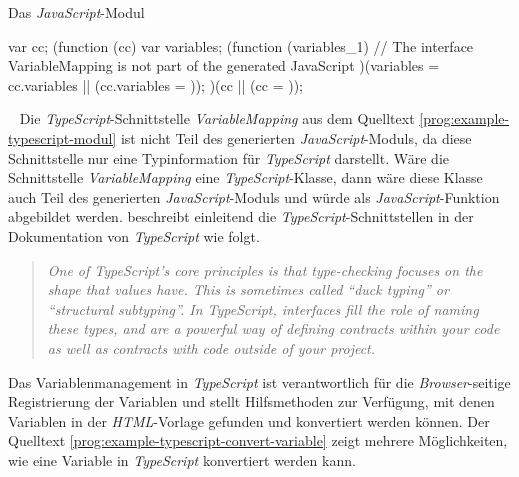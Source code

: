 \begin{program}[h]
\caption{Das \emph{JavaScript}-Modul}
\label{prog:example-javascript-modul}
\begin{JsCode}[numbers=none]
var cc;
(function (cc) {
    var variables;
    (function (variables_1) {
    // The interface VariableMapping is not part of the generated JavaScript
    })(variables = cc.variables || (cc.variables = {}));
})(cc || (cc = {}));                 
\end{JsCode}
\end{program}
\ \newline
Die \emph{TypeScript}-Schnittstelle \emph{VariableMapping} aus dem Quelltext \ref{prog:example-typescript-modul} ist nicht Teil des generierten \emph{JavaScript}-Moduls, da diese Schnittstelle nur eine Typinformation für \emph{TypeScript} darstellt. Wäre die Schnittstelle \emph{VariableMapping} eine \emph{TypeScript}-Klasse, dann wäre diese Klasse auch Teil des generierten \emph{JavaScript}-Moduls und würde als \emph{JavaScript}-Funktion abgebildet werden.
\newline
{} beschreibt einleitend die  \emph{TypeScript}-Schnittstellen in der Dokumentation von \emph{TypeScript} wie folgt.
\begin{quote}
	\emph{One of TypeScript’s core principles is that type-checking focuses on the shape that values have. This is sometimes called “duck typing” or “structural subtyping”. In TypeScript, interfaces fill the role of naming these types, and are a powerful way of defining contracts within your code as well as contracts with code outside of your project.}
\end{quote}
Das Variablenmanagement in \emph{TypeScript} ist verantwortlich für die \emph{Browser}-seitige Registrierung der Variablen und stellt Hilfsmethoden zur Verfügung, mit denen Variablen in der \emph{HTML}-Vorlage gefunden und konvertiert werden können. Der Quelltext \ref{prog:example-typescript-convert-variable} zeigt mehrere Möglichkeiten, wie eine Variable in \emph{TypeScript} konvertiert werden kann.
\newpage

